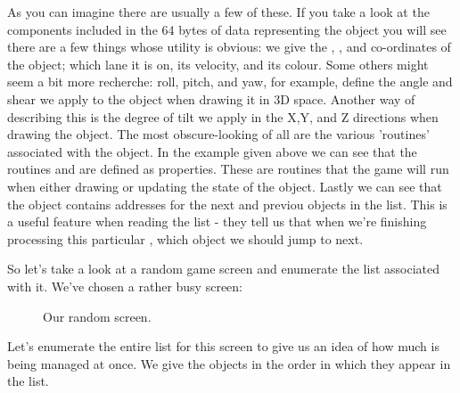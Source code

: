 As you can imagine there are usually a few of these. If you take a look at the components included
in the 64 bytes of data representing the object you will see there are a few things whose utility
is obvious: we give the , , and  co-ordinates of the object; which lane
it is on, its velocity, and its colour. Some others might seem a bit more recherche: roll, pitch,
and yaw, for example, define the angle and shear we apply to the object when drawing it in 3D space. Another
way of describing this is the degree of tilt we apply in the X,Y, and Z directions when drawing the object.
The most obscure-looking of all are the various 'routines' associated with the object. In the example given
above we can see that the routines  and  are defined as properties. These
are routines that the game will run when either drawing or updating the state of the object. Lastly we can see
that the object contains addresses for the next and previou objects in the list. This is a useful feature
when reading the  list - they tell us that when we're finishing processing this particular
, which object we should jump to next.

So let's take a look at a random game screen and enumerate the  list associated with it.
We've chosen a rather busy screen:
\begin{figure}[H]
    \centering
  \caption{Our random screen.}
\end{figure}

Let's enumerate the entire  list for this screen to give us an idea of how much is being managed 
at once. We give the objects in the order in which they appear in the list.

